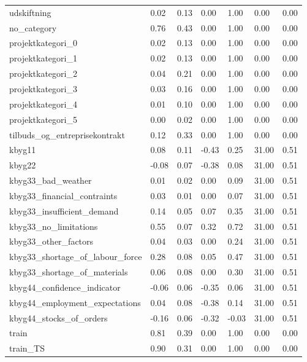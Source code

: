 \begin{landscape}
\begin{longtable}[h!]{lllllll}
udskiftning & 0.02 & 0.13 & 0.00 & 1.00 & 0.00 & 0.00 \\
no_category & 0.76 & 0.43 & 0.00 & 1.00 & 0.00 & 0.00 \\
projektkategori_0 & 0.02 & 0.13 & 0.00 & 1.00 & 0.00 & 0.00 \\
projektkategori_1 & 0.02 & 0.13 & 0.00 & 1.00 & 0.00 & 0.00 \\
projektkategori_2 & 0.04 & 0.21 & 0.00 & 1.00 & 0.00 & 0.00 \\
projektkategori_3 & 0.03 & 0.16 & 0.00 & 1.00 & 0.00 & 0.00 \\
projektkategori_4 & 0.01 & 0.10 & 0.00 & 1.00 & 0.00 & 0.00 \\
projektkategori_5 & 0.00 & 0.02 & 0.00 & 1.00 & 0.00 & 0.00 \\
tilbuds_og_entreprisekontrakt & 0.12 & 0.33 & 0.00 & 1.00 & 0.00 & 0.00 \\
kbyg11 & 0.08 & 0.11 & -0.43 & 0.25 & 31.00 & 0.51 \\
kbyg22 & -0.08 & 0.07 & -0.38 & 0.08 & 31.00 & 0.51 \\
kbyg33_bad_weather & 0.01 & 0.02 & 0.00 & 0.09 & 31.00 & 0.51 \\
kbyg33_financial_contraints & 0.03 & 0.01 & 0.00 & 0.07 & 31.00 & 0.51 \\
kbyg33_insufficient_demand & 0.14 & 0.05 & 0.07 & 0.35 & 31.00 & 0.51 \\
kbyg33_no_limitations & 0.55 & 0.07 & 0.32 & 0.72 & 31.00 & 0.51 \\
kbyg33_other_factors & 0.04 & 0.03 & 0.00 & 0.24 & 31.00 & 0.51 \\
kbyg33_shortage_of_labour_force & 0.28 & 0.08 & 0.05 & 0.47 & 31.00 & 0.51 \\
kbyg33_shortage_of_materials & 0.06 & 0.08 & 0.00 & 0.30 & 31.00 & 0.51 \\
kbyg44_confidence_indicator & -0.06 & 0.06 & -0.35 & 0.06 & 31.00 & 0.51 \\
kbyg44_employment_expectations & 0.04 & 0.08 & -0.38 & 0.14 & 31.00 & 0.51 \\
kbyg44_stocks_of_orders & -0.16 & 0.06 & -0.32 & -0.03 & 31.00 & 0.51 \\
train & 0.81 & 0.39 & 0.00 & 1.00 & 0.00 & 0.00 \\
train_TS & 0.90 & 0.31 & 0.00 & 1.00 & 0.00 & 0.00 \\
\end{longtable}\end{landscape}

